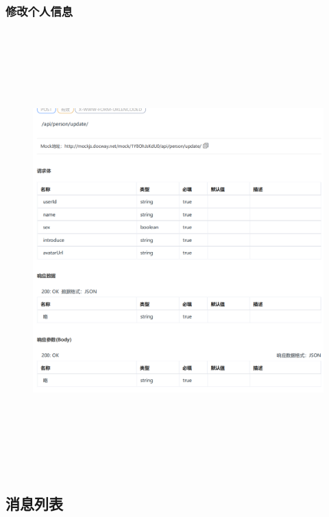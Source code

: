          \subsubsection{修改个人信息}     
         \begin{figure}[h]
            \centering
            \includegraphics[height=17.0cm,width=14.0cm]{design/image/api28.png} 
            \end{figure}  
            \newpage
        \subsection{消息列表}

